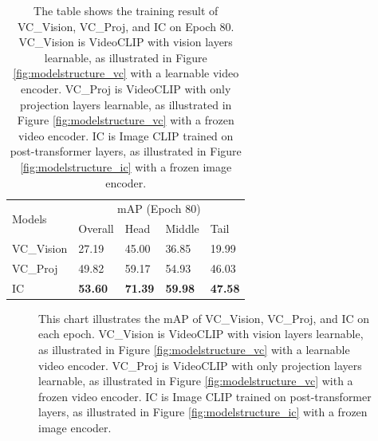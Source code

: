 \begin{table}[ht]
    \centering
    \caption[Training Results for Visual Encoder Selection on Epoch 80]{The table shows the training result of VC\_Vision, VC\_Proj, and IC on Epoch 80. VC\_Vision is VideoCLIP with vision layers learnable, as illustrated in Figure \ref{fig:modelstructure_vc} with a learnable video encoder. VC\_Proj is VideoCLIP with only projection layers learnable, as illustrated in Figure \ref{fig:modelstructure_vc} with a frozen video encoder. IC is Image CLIP trained on post-transformer layers, as illustrated in Figure \ref{fig:modelstructure_ic} with a frozen image encoder.}
    \label{tab:resultsbackbone}
    \begin{tabular}{lllll}
        \toprule
        \multirow{2}{*}{Models} & \multicolumn{4}{c}{mAP (Epoch 80)} \\
        \cmidrule{2-5} 
        {} & Overall & Head  & Middle & Tail \\
        \midrule
        VC\_Vision  & 27.19   & 45.00 & 36.85 & 19.99 \\
        VC\_Proj    & 49.82   & 59.17 & 54.93 & 46.03 \\
        IC          & \textbf{53.60} & \textbf{71.39} & \textbf{59.98} & \textbf{47.58} \\
        \bottomrule
    \end{tabular}
\end{table}

\begin{figure}[ht]
    \centering
    \resizebox{1.0\textwidth}{!}{}
    \caption[mAP of VC\_Vision, VC\_Proj, and IC on each Epoch]{This chart illustrates the mAP of VC\_Vision, VC\_Proj, and IC on each epoch. VC\_Vision is VideoCLIP with vision layers learnable, as illustrated in Figure \ref{fig:modelstructure_vc} with a learnable video encoder. VC\_Proj is VideoCLIP with only projection layers learnable, as illustrated in Figure \ref{fig:modelstructure_vc} with a frozen video encoder. IC is Image CLIP trained on post-transformer layers, as illustrated in Figure \ref{fig:modelstructure_ic} with a frozen image encoder.}
    \label{fig:tp_backbone}
\end{figure}

